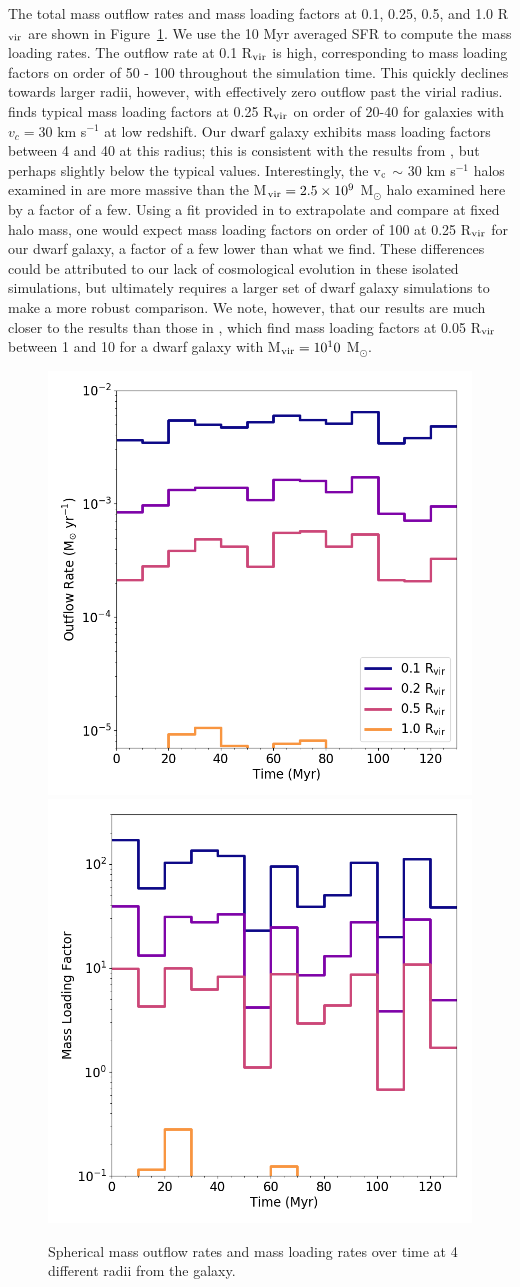 \documentclass[twocolumn]{aastex61}
\begin{document}
The total mass outflow rates and mass loading factors at 0.1, 0.25, 0.5, and 1.0 R$_{\rm vir}$ are shown in Figure~\ref{fig:mass_outflow}. We use the 10 Myr averaged SFR to compute the mass loading rates. The outflow rate at 0.1 R$_{\rm vir}$ is high, corresponding to mass loading factors on order of 50 - 100 throughout the simulation time. This quickly declines towards larger radii, however, with effectively zero outflow past the virial radius. \cite{Muratov2015} finds typical mass loading factors at 0.25 R$_{\rm vir}$ on order of 20-40 for galaxies with $v_{c} = 30$ km s$^{-1}$ at low redshift. Our dwarf galaxy exhibits mass loading factors between 4 and 40 at this radius; this is consistent with the results from \cite{Muratov2015}, but perhaps slightly below the typical values. Interestingly, the v$_{\rm c}$ $\sim$ 30 km s$^{-1}$ halos examined in \cite{Muratov2015} are more massive than the M$_{\rm vir} = 2.5\times 10^9$ M$_{\odot}$ halo examined here by a factor of a few. Using a fit provided in \cite{Muratov2015} to extrapolate and compare at fixed halo mass, one would expect mass loading factors on order of 100 at 0.25 R$_{\rm vir}$ for our dwarf galaxy, a factor of a few lower than what we find. These differences could be attributed to our lack of cosmological evolution in these isolated simulations, but ultimately requires a larger set of dwarf galaxy simulations to make a more robust comparison. We note, however, that our results are much closer to the \citep{Muratov2015} results than those in \cite{Hu2016,Hu2017}, which find mass loading factors at 0.05 R$_{\rm vir}$ between 1 and 10 for a dwarf galaxy with M$_{\rm vir} = 10^10$ M$_{\odot}$.

\begin{figure}
\centering
\includegraphics[width=0.45\linewidth]{total_mass_outflow}
\includegraphics[width=0.45\linewidth]{total_mass_loading}
\caption{Spherical mass outflow rates and mass loading rates over time at 4 different radii from the galaxy.}
\label{fig:mass_outflow}
\end{figure}
\end{document}
